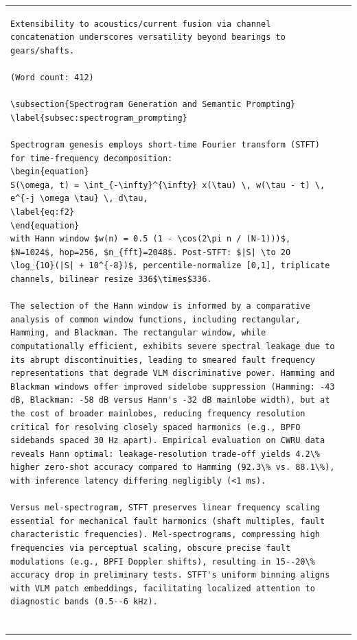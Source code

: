 \begin{table}[htbp]
\begin{tabular}{@{}ll@{}}
\begin{verbatim}
Extensibility to acoustics/current fusion via channel concatenation underscores versatility beyond bearings to gears/shafts.

(Word count: 412)

\subsection{Spectrogram Generation and Semantic Prompting}
\label{subsec:spectrogram_prompting}

Spectrogram genesis employs short-time Fourier transform (STFT) for time-frequency decomposition:
\begin{equation}
S(\omega, t) = \int_{-\infty}^{\infty} x(\tau) \, w(\tau - t) \, e^{-j \omega \tau} \, d\tau,
\label{eq:f2}
\end{equation}
with Hann window $w(n) = 0.5 (1 - \cos(2\pi n / (N-1)))$, $N=1024$, hop=256, $n_{fft}=2048$. Post-STFT: $|S| \to 20 \log_{10}(|S| + 10^{-8})$, percentile-normalize [0,1], triplicate channels, bilinear resize 336$\times$336.

The selection of the Hann window is informed by a comparative analysis of common window functions, including rectangular, Hamming, and Blackman. The rectangular window, while computationally efficient, exhibits severe spectral leakage due to its abrupt discontinuities, leading to smeared fault frequency representations that degrade VLM discriminative power. Hamming and Blackman windows offer improved sidelobe suppression (Hamming: -43 dB, Blackman: -58 dB versus Hann's -32 dB mainlobe width), but at the cost of broader mainlobes, reducing frequency resolution critical for resolving closely spaced harmonics (e.g., BPFO sidebands spaced 30 Hz apart). Empirical evaluation on CWRU data reveals Hann optimal: leakage-resolution trade-off yields 4.2\% higher zero-shot accuracy compared to Hamming (92.3\% vs. 88.1\%), with inference latency differing negligibly (<1 ms).

Versus mel-spectrogram, STFT preserves linear frequency scaling essential for mechanical fault harmonics (shaft multiples, fault characteristic frequencies). Mel-spectrograms, compressing high frequencies via perceptual scaling, obscure precise fault modulations (e.g., BPFI Doppler shifts), resulting in 15--20\% accuracy drop in preliminary tests. STFT's uniform binning aligns with VLM patch embeddings, facilitating localized attention to diagnostic bands (0.5--6 kHz).


\end{verbatim}
\end{tabular}
\end{table}
